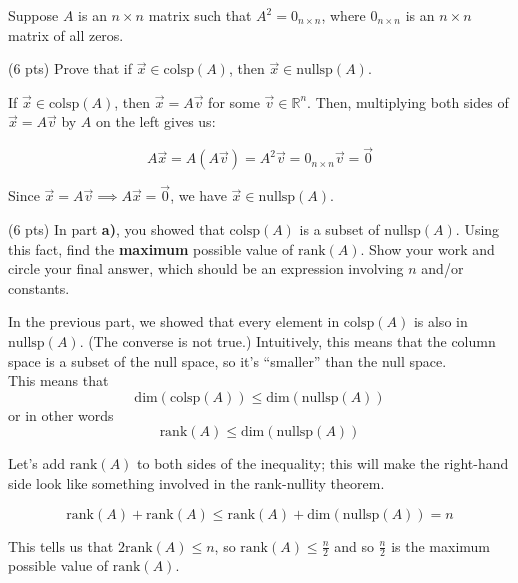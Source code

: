 \documentclass[11pt]{article}
\begin{document}
\newpage

\begin{prob}
Suppose $A$ is an $n \times n$ matrix such that $A^2 = 0_{n \times n}$, where $0_{n \times n}$ is an $n \times n$ matrix of all zeros.

\begin{subprob}(6 pts) Prove that if $\vec x \in \text{colsp}(A)$, then $\vec x \in \text{nullsp}(A)$.

\emptybox{8cm}

\begin{solution}
If $\vec x \in \text{colsp}(A)$, then $\vec x = A \vec v$ for some $\vec v \in \mathbb{R}^n$. Then, multiplying both sides of $\vec x = A \vec v$ by $A$ on the left gives us:

$$A \vec x = A (A \vec v) = A^2 \vec v = 0_{n \times n} \vec v = \vec 0$$

Since $\vec x = A \vec v \implies A \vec x = \vec 0$, we have $\vec x \in \text{nullsp}(A)$.
\end{solution}
\end{subprob}

\begin{subprob}(6 pts) In part \textbf{a)}, you showed that $\text{colsp}(A)$ is a subset of $\text{nullsp}(A)$. Using this fact, find the \textbf{maximum} possible value of $\text{rank}(A)$. Show your work and $\boxed{\text{circle}}$ your final answer, which should be an expression involving $n$ and/or constants.

\emptybox{10cm}

\begin{solution}
In the previous part, we showed that every element in $\text{colsp}(A)$ is also in $\text{nullsp}(A)$. (The converse is not true.) Intuitively, this means that the column space is a subset of the null space, so it's ``smaller'' than the null space. \\

This means that $$\text{dim}(\text{colsp}(A)) \leq \text{dim}(\text{nullsp}(A))$$ or in other words $$\text{rank}(A) \leq \text{dim}(\text{nullsp}(A))$$

Let's add $\text{rank}(A)$ to both sides of the inequality; this will make the right-hand side look like something involved in the rank-nullity theorem.

$$\text{rank}(A) + \text{rank}(A) \leq \text{rank}(A) + \text{dim}(\text{nullsp}(A)) = n$$

This tells us that $2\text{rank}(A) \leq n$, so $\boxed{\text{rank}(A) \leq \frac{n}{2}}$ and so $\frac{n}{2}$ is the maximum possible value of $\text{rank}(A)$.
\end{solution}
\end{subprob}

\end{prob}
\end{document}
